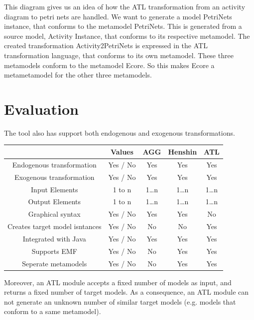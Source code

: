 \documentclass[pdftex,11pt,a4paper]{article}
\begin{document}
This diagram gives us an idea of how the ATL transformation from an activity
diagram to petri nets are handled. We want to generate a model PetriNets
instance, that conforms to the metamodel PetriNets. This is generated from a
source model, Activity Instance, that conforms to its respective metamodel.
The created transformation Activity2PetriNets is expressed in the ATL
transformation  language, that conforms to its own metamodel. These three
metamodels conform to the metamodel Ecore. So this makes Ecore a metametamodel
for the other three metamodels. 



\section{Evaluation}
The tool also has support 
both endogenous and exogenous transformations.

\begin{table}[ht]
\centering
\begin{tabular}{| c | c | c | c | c |}
\hline
&Values & AGG & Henshin & ATL \\
\hline
Endogenous transformation& Yes / No & \cellcolor{green!25}Yes &
\cellcolor{green!25}Yes & \cellcolor{green!25}Yes \\

Exogenous transformation& Yes / No & \cellcolor{green!25}Yes &
\cellcolor{green!25}Yes & \cellcolor{green!25}Yes \\

Input Elements& 1 to n & 1\ldots n & 1\ldots n & 1\ldots n\\
Output Elements & 1 to n & 1\ldots n & 1\ldots n & 1\ldots n\\
Graphical syntax& Yes / No &\cellcolor{green!25}Yes &
\cellcolor{green!25}Yes &\cellcolor{red!25}No  \\
Creates target model isntances & Yes / No &\cellcolor{red!25}No &
\cellcolor{red!25}No &\cellcolor{green!25}Yes \\
Integrated with Java& Yes / No & \cellcolor{green!25}Yes &
\cellcolor{green!25}Yes & \cellcolor{green!25}Yes \\
Supports EMF& Yes / No & \cellcolor{red!25}No &
\cellcolor{green!25}Yes & \cellcolor{green!25}Yes \\
Seperate metamodels& Yes / No & \cellcolor{red!25}No &
\cellcolor{green!25}Yes & \cellcolor{green!25}Yes \\
\hline

\end{tabular}
\end{table}

Moreover, an ATL module accepts a fixed number of models as input, and returns a fixed number of 
target models. As a consequence, an ATL module can not generate an unknown number of similar
target models (e.g. models that conform to a same metamodel).


\pagebreak
 

\end{document}
